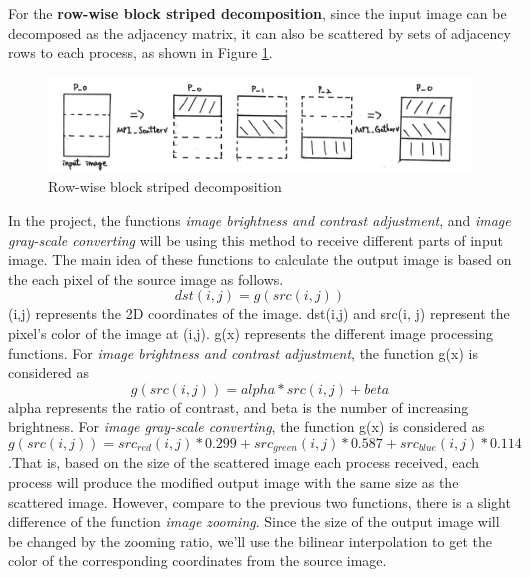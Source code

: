 \documentclass[12pt]{diazessay}
\begin{document}
For the \textbf{row-wise block striped decomposition}, since the input image can be decomposed as the adjacency matrix, it can also be scattered by sets of adjacency rows to each process, as shown in Figure \ref{row_wise}.
\begin{figure}[h]
    \centering
	\includegraphics[scale=0.6, clip]{pics/row_wise.jpg}
	\caption {Row-wise block striped decomposition}
	\label{row_wise}
\end{figure}
\newline
In the project, the functions \textit{image brightness and contrast adjustment}, and \textit{image gray-scale converting} will be using this method to receive different parts of input image. The main idea of these functions to calculate the output image is based on the each pixel of the source image as follows. $$dst(i,j)= g(src(i,j))$$ (i,j) represents the 2D coordinates of the image. dst(i,j) and src(i, j) represent the pixel's color of the image at (i,j). g(x) represents the different image processing functions. For \textit{image brightness and contrast adjustment}, the function g(x) is considered as $$g(src(i,j))=alpha *src(i,j) + beta$$alpha represents the ratio of contrast, and beta is the number of increasing brightness\cite{Opencv}. For \textit{image gray-scale converting}, the function g(x) is considered as $$g(src(i,j))= src_{red}(i,j)*0.299 + src_{green}(i,j)*0.587 + src_{blue}(i,j)*0.114$$  \cite{Matlab}.That is, based on the size of the scattered image each process received, each process will produce the modified output image with the same size as the scattered image.  
However, compare to the previous two functions, there is a slight difference of the function \textit{image zooming}. Since the size of the output image will be changed by the zooming ratio, we'll use the bilinear interpolation to get the color of the corresponding coordinates from the source image. 
\end{document}

